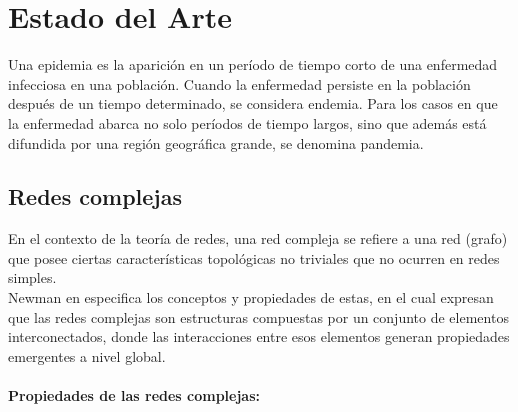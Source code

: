 \chapter{Estado del Arte}\label{chapter:state-of-the-art}
Una epidemia es la aparición en un período de tiempo corto de una enfermedad infecciosa en
una población. Cuando la enfermedad persiste en la población después de un tiempo determinado, 
se considera endemia. Para los casos en que la enfermedad abarca no solo períodos de
tiempo largos, sino que además está difundida por una región geográfica grande, se denomina
pandemia.
\section{Redes complejas}
En el contexto de la teoría de redes, una red compleja se refiere a una red (grafo) que posee
ciertas características topológicas no triviales que no ocurren en redes simples.\\
Newman en \autocite{Newman2003} especifica los conceptos y propiedades de estas,
en el cual expresan que las redes complejas son estructuras compuestas por un conjunto de elementos interconectados, 
donde las interacciones entre esos elementos generan propiedades emergentes a nivel global.\\ 
\\
\textbf{Propiedades de las redes complejas:} 
